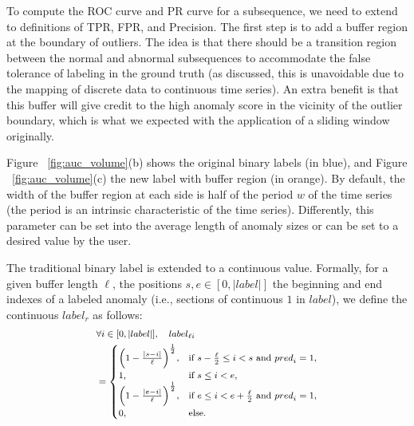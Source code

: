 To compute the ROC curve and PR curve for a subsequence, we need to extend to definitions of TPR, FPR, and Precision. 
The first step is to add a buffer region at the boundary of outliers. The idea is that there should be a transition region between the normal and abnormal subsequences to accommodate the false tolerance of labeling in the ground truth (as discussed, this is unavoidable due to the mapping of discrete data to continuous time series). An extra benefit is that this buffer will give credit to the high anomaly score in the vicinity of the outlier boundary, which is what we expected with the application of a sliding window originally. 

Figure ~\ref{fig:auc_volume}(b) shows the original binary labels (in blue), and Figure ~\ref{fig:auc_volume}(c) the new label with buffer region (in orange). By default, the width of the buffer region at each side is half of the period $w$ of the time series (the period is an intrinsic characteristic of the time series). Differently, this parameter can be set into the average length of anomaly sizes or can be set to a desired value by the user.

The traditional binary label is extended to a continuous value. Formally, for a given buffer length $\ell$, the positions $s,e \in [0,|label|]$ the beginning and end indexes of a labeled anomaly (i.e., sections of continuous $1$ in $label$), we define the continuous $label_r$ as follows:
\begin{equation}
\footnotesize{
\begin{split}
&\forall i \in [0,|label|], \quad label_{\ell i} \\
& = \begin{cases}
\bigg(1-\frac{|s-i|}{\ell}\bigg)^{\frac{1}{2}}, & \text{if } s-\frac{\ell}{2} \leq i < s \text{ and } {pred}_i = 1, \\
1, & \text{if } s \leq i < e, \\
\bigg(1-\frac{|e-i|}{\ell}\bigg)^{\frac{1}{2}}, & \text{if } e \leq i < e+\frac{\ell}{2} \text{ and } {pred}_i = 1, \\
0, & \text{else}.
\end{cases}
\end{split}
\label{label_equation}
}
\end{equation}

